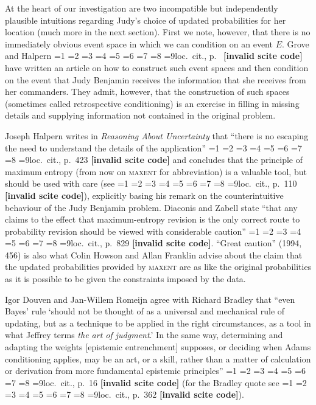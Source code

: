\documentclass[12pt]{article}
\newcommand{\qeins}[1]{``#1''}
\newcommand{\qzwei}[1]{`#1'}
\newif\ifNumericalOrYear
\newcommand{\PageP}{p.~}
\newcommand{\PageP}{}
\newcommand{\scite}[3]{\ifnum#1=1\ifNumericalOrYear\citep{#2}\else\citeyearpar{#2}\fi\else
\ifnum#1=2\ifNumericalOrYear\citep[#3]{#2}\else\citep[{\PageP}#3]{#2}\fi\else
\ifnum#1=3\ifNumericalOrYear(\citet[#3]{#2})\else\citep[{\PageP}#3]{#2}\fi\else
\ifnum#1=4\ifNumericalOrYear\citet{#2}\else\citet{#2}\fi\else
\ifnum#1=5\ifNumericalOrYear(\citet{#2})\else\citep{#2}\fi\else
\ifnum#1=6\ifNumericalOrYear(\citet[#3]{#2})\else\citep[{\PageP}#3]{#2}\fi\else
\ifnum#1=7\ifNumericalOrYear\citep{#2}\else\citealp{#2}\fi\else
\ifnum#1=8\ifNumericalOrYear\citep[#3]{#2}\else\citealp[{\PageP}#3]{#2}\fi\else
\ifnum#1=9\ifNumericalOrYear\citep[#3]{#2}\else{}loc.\ cit., {\PageP}#3\fi\else
\textbf{[invalid scite code]}\fi\fi\fi\fi\fi\fi\fi\fi\fi}
\begin{document}
At the heart of our investigation are two incompatible but
independently plausible intuitions regarding Judy's choice of
updated probabilities for her location (much more in the next
section). First we note, however, that there is no immediately obvious
event space in which we can condition on an event $E$. Grove and
Halpern \scite{1}{grovehalpern97}{} have written an article on how to
construct such event spaces and then condition on the event that Judy
Benjamin receives the information that she receives from her
commanders. They admit, however, that the construction of such spaces
(sometimes called retrospective conditioning) is an exercise in
filling in missing details and supplying information not contained in
the original problem.

Joseph Halpern writes in \emph{Reasoning About Uncertainty} that
\qeins{there is no escaping the need to understand the details of the
  application} \scite{2}{halpern03}{423} and concludes that the
principle of maximum entropy (from now on \textsc{maxent} for
abbreviation) is a valuable tool, but should be used with care (see
\scite{8}{grovehalpern97}{110}), explicitly basing his remark on the
counterintuitive behaviour of the Judy Benjamin problem. Diaconis and
Zabell state \qeins{that any claims to the effect that maximum-entropy
  revision is the only correct route to probability revision should be
  viewed with considerable caution} \scite{2}{diaconiszabell82}{829}.
\qeins{Great caution} (1994, 456) is also what Colin Howson and Allan
Franklin advise about the claim that the updated probabilities
provided by \textsc{maxent} are as like the original probabilities as
it is possible to be given the constraints imposed by the data.

Igor Douven and Jan-Willem Romeijn agree with Richard Bradley that
\qeins{even Bayes' rule \qzwei{should not be thought of as a universal
    and mechanical rule of updating, but as a technique to be applied
    in the right circumstances, as a tool in what Jeffrey terms
    \emph{the art of judgment}.} In the same way, determining and
  adapting the weights [epistemic entrenchment] supposes, or deciding
  when Adams conditioning applies, may be an art, or a skill, rather
  than a matter of calculation or derivation from more fundamental
  epistemic principles} \scite{2}{douvenromeijn09}{16} (for the
Bradley quote see \scite{8}{bradley05}{362}).
\end{document}
